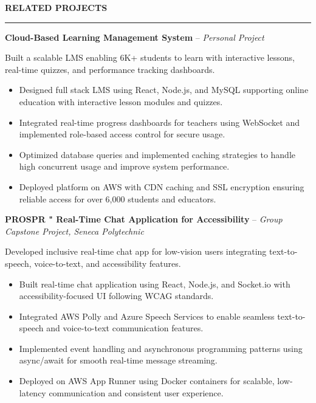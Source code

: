 \documentclass[10pt,letterpaper]{article}
\begin{document}
\vspace{6pt}

\textbf{RELATED PROJECTS}\\[-8pt]
\noindent\rule{\textwidth}{1pt}

\vspace{-2pt}

\textbf{Cloud-Based Learning Management System} -- \emph{Personal Project}

\vspace{-1pt}

Built a scalable LMS enabling 6K+ students to learn with interactive lessons, real-time quizzes, and performance tracking dashboards.
\vspace{-1pt}
\begin{itemize}
\item Designed full stack LMS using React, Node.js, and MySQL supporting online education with interactive lesson modules and quizzes.
\item Integrated real-time progress dashboards for teachers using WebSocket and implemented role-based access control for secure usage.
\item Optimized database queries and implemented caching strategies to handle high concurrent usage and improve system performance.
\item Deployed platform on AWS with CDN caching and SSL encryption ensuring reliable access for over 6,000 students and educators.
\end{itemize}

\textbf{PROSPR " Real-Time Chat Application for Accessibility} -- \emph{Group Capstone Project, Seneca Polytechnic}

\vspace{-1pt}

Developed inclusive real-time chat app for low-vision users integrating text-to-speech, voice-to-text, and accessibility features.
\vspace{-1pt}
\begin{itemize}
\item Built real-time chat application using React, Node.js, and Socket.io with accessibility-focused UI following WCAG standards.
\item Integrated AWS Polly and Azure Speech Services to enable seamless text-to-speech and voice-to-text communication features.
\item Implemented event handling and asynchronous programming patterns using async/await for smooth real-time message streaming.
\item Deployed on AWS App Runner using Docker containers for scalable, low-latency communication and consistent user experience.
\end{itemize}
\end{document}
